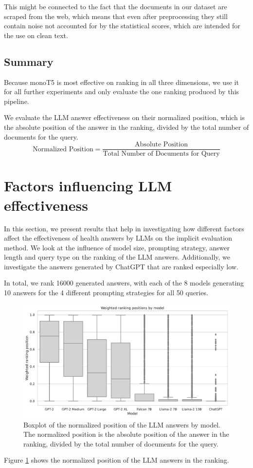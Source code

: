 This might be connected to the fact that the documents in our dataset are scraped from the web, which means that even after preprocessing they still contain noise not accounted for by the statistical scores, which are intended for the use on clean text.

\subsection{Summary}
Because monoT5 is most effective on ranking in all three dimensions, we use it for all further experiments and only evaluate the one ranking produced by this pipeline.

We evaluate the LLM answer effectiveness on their normalized position, which is the absolute position of the answer in the ranking, divided by the total number of documents for the query.
\begin{equation}
    \text{Normalized Position} = \frac{\text{Absolute Position}}{\text{Total Number of Documents for Query}}
\end{equation}

\section{Factors influencing LLM effectiveness}
In this section, we present results that help in investigating how different factors affect the effectiveness of health answers by LLMs on the implicit evaluation method.
We look at the influence of model size, prompting strategy, answer length and query type on the ranking of the LLM answers.
Additionally, we investigate the answers generated by ChatGPT that are ranked especially low.

In total, we rank 16000 generated answers, with each of the 8 models generating 10 answers for the 4 different prompting strategies for all 50 queries.
\begin{figure}[tb]
\centering
\includegraphics[width=\textwidth]{images/weighted_position_boxplot.pdf}
\caption{Boxplot of the normalized position of the LLM answers by model. The normalized position is the absolute position of the answer in the ranking, divided by the total number of documents for the query.}
\label{fig:weighted_position_boxplot}
\end{figure}
Figure \ref{fig:weighted_position_boxplot} shows the normalized position of the LLM answers in the ranking.

